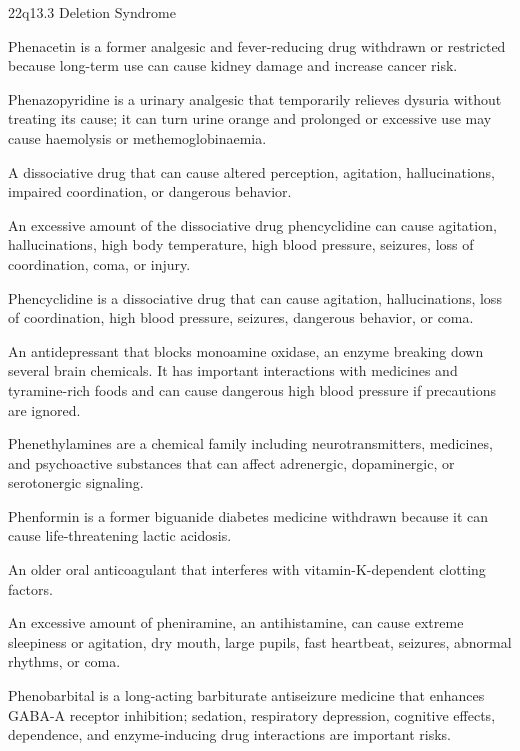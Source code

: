 \synonyms
22q13.3 Deletion Syndrome

 Phenacetin is a former analgesic and fever-reducing drug withdrawn or restricted because long-term use can cause kidney damage and increase cancer risk.

 Phenazopyridine is a urinary analgesic that temporarily relieves dysuria without treating its cause; it can turn urine orange and prolonged or excessive use may cause haemolysis or methemoglobinaemia.

 A dissociative drug that can cause altered perception, agitation, hallucinations, impaired coordination, or dangerous behavior.

 An excessive amount of the dissociative drug phencyclidine can cause agitation, hallucinations, high body temperature, high blood pressure, seizures, loss of coordination, coma, or injury.

 Phencyclidine is a dissociative drug that can cause agitation, hallucinations, loss of coordination, high blood pressure, seizures, dangerous behavior, or coma.

 An antidepressant that blocks monoamine oxidase, an enzyme breaking down several brain chemicals. It has important interactions with medicines and tyramine-rich foods and can cause dangerous high blood pressure if precautions are ignored.

 Phenethylamines are a chemical family including neurotransmitters, medicines, and psychoactive substances that can affect adrenergic, dopaminergic, or serotonergic signaling.

 Phenformin is a former biguanide diabetes medicine withdrawn because it can cause life-threatening lactic acidosis.

 An older oral anticoagulant that interferes with vitamin-K-dependent clotting factors.

 An excessive amount of pheniramine, an antihistamine, can cause extreme sleepiness or agitation, dry mouth, large pupils, fast heartbeat, seizures, abnormal rhythms, or coma.

 Phenobarbital is a long-acting barbiturate antiseizure medicine that enhances GABA-A receptor inhibition; sedation, respiratory depression, cognitive effects, dependence, and enzyme-inducing drug interactions are important risks.

